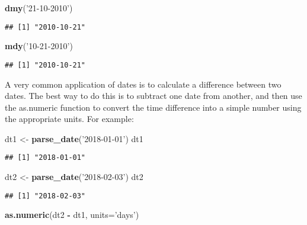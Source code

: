 \documentclass[
]{article}
\newenvironment{Shaded}{\begin{snugshade}}{\end{snugshade}}
\newcommand{\DataTypeTok}[1]{\textcolor[rgb]{0.13,0.29,0.53}{#1}}
\newcommand{\KeywordTok}[1]{\textcolor[rgb]{0.13,0.29,0.53}{\textbf{#1}}}
\newcommand{\NormalTok}[1]{#1}
\newcommand{\OperatorTok}[1]{\textcolor[rgb]{0.81,0.36,0.00}{\textbf{#1}}}
\newcommand{\StringTok}[1]{\textcolor[rgb]{0.31,0.60,0.02}{#1}}
\begin{document}
\begin{Shaded}
\begin{Highlighting}[]
\KeywordTok{dmy}\NormalTok{(}\StringTok{'21-10-2010'}\NormalTok{)}
\end{Highlighting}
\end{Shaded}

\begin{verbatim}
## [1] "2010-10-21"
\end{verbatim}

\begin{Shaded}
\begin{Highlighting}[]
\KeywordTok{mdy}\NormalTok{(}\StringTok{'10-21-2010'}\NormalTok{)}
\end{Highlighting}
\end{Shaded}

\begin{verbatim}
## [1] "2010-10-21"
\end{verbatim}

A very common application of dates is to calculate a difference between
two dates. The best way to do this is to subtract one date from another,
and then use the as.numeric function to convert the time difference into
a simple number using the appropriate units. For example:

\begin{Shaded}
\begin{Highlighting}[]
\NormalTok{dt1 <-}\StringTok{ }\KeywordTok{parse_date}\NormalTok{(}\StringTok{'2018-01-01'}\NormalTok{)}
\NormalTok{dt1}
\end{Highlighting}
\end{Shaded}

\begin{verbatim}
## [1] "2018-01-01"
\end{verbatim}

\begin{Shaded}
\begin{Highlighting}[]
\NormalTok{dt2 <-}\StringTok{ }\KeywordTok{parse_date}\NormalTok{(}\StringTok{'2018-02-03'}\NormalTok{)}
\NormalTok{dt2}
\end{Highlighting}
\end{Shaded}

\begin{verbatim}
## [1] "2018-02-03"
\end{verbatim}

\begin{Shaded}
\begin{Highlighting}[]
\KeywordTok{as.numeric}\NormalTok{(dt2 }\OperatorTok{-}\StringTok{ }\NormalTok{dt1, }\DataTypeTok{units=}\StringTok{'days'}\NormalTok{)}
\end{Highlighting}
\end{Shaded}
\end{document}
